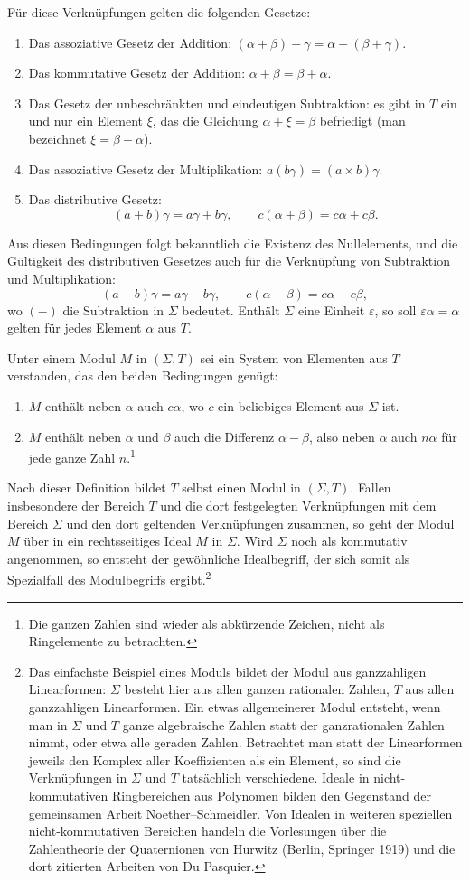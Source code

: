 \documentclass[11pt]{article}
\begin{document}
Für diese Verknüpfungen gelten die folgenden Gesetze:
\begin{enumerate}
\item Das assoziative Gesetz der Addition: $(\alpha+\beta)+\gamma=\alpha+(\beta+\gamma)$.
\item Das kommutative Gesetz der Addition: $\alpha+\beta=\beta+\alpha$.
\item Das Gesetz der unbeschränkten und eindeutigen Subtraktion: es gibt in $T$ ein und nur ein Element $\xi$, das die Gleichung $\alpha+\xi=\beta$ befriedigt (man bezeichnet $\xi=\beta-\alpha$).
\item Das assoziative Gesetz der Multiplikation: $a(b\gamma)=(a\times b)\gamma$.
\item Das distributive Gesetz:
\[
 (a+b)\gamma=a\gamma+b\gamma,\qquad c(\alpha+\beta)=c\alpha+c\beta.
\]
\end{enumerate}
Aus diesen Bedingungen folgt bekanntlich die Existenz des Nullelements, und die Gültigkeit des distributiven Gesetzes auch für die Verknüpfung von Subtraktion und Multiplikation:
\[
 (a-b)\gamma=a\gamma-b\gamma,\qquad c(\alpha-\beta)=c\alpha-c\beta,
\]
wo $(-)$ die Subtraktion in $\Sigma$ bedeutet. Enthält $\Sigma$ eine Einheit $\varepsilon$, so soll $\varepsilon\alpha=\alpha$ gelten für jedes Element $\alpha$ aus $T$.

Unter einem Modul $M$ in $(\Sigma,T)$ sei ein System von Elementen aus $T$ verstanden, das den beiden Bedingungen genügt:
\begin{enumerate}
\item $M$ enthält neben $\alpha$ auch $c\alpha$, wo $c$ ein beliebiges Element aus $\Sigma$ ist.
\item $M$ enthält neben $\alpha$ und $\beta$ auch die Differenz $\alpha-\beta$, also neben $\alpha$ auch $n\alpha$ für jede ganze Zahl $n$.\footnote{Die ganzen Zahlen sind wieder als abkürzende Zeichen, nicht als Ringelemente zu betrachten.}
\end{enumerate}
Nach dieser Definition bildet $T$ selbst einen Modul in $(\Sigma,T)$. Fallen insbesondere der Bereich $T$ und die dort festgelegten Verknüpfungen mit dem Bereich $\Sigma$ und den dort geltenden Verknüpfungen zusammen, so geht der Modul $M$ über in ein rechtsseitiges Ideal $M$ in $\Sigma$. Wird $\Sigma$ noch als kommutativ angenommen, so entsteht der gewöhnliche Idealbegriff, der sich somit als Spezialfall des Modulbegriffs ergibt.\footnote{Das einfachste Beispiel eines Moduls bildet der Modul aus ganzzahligen Linearformen: $\Sigma$ besteht hier aus allen ganzen rationalen Zahlen, $T$ aus allen ganzzahligen Linearformen. Ein etwas allgemeinerer Modul entsteht, wenn man in $\Sigma$ und $T$ ganze algebraische Zahlen statt der ganzrationalen Zahlen nimmt, oder etwa alle geraden Zahlen. Betrachtet man statt der Linearformen jeweils den Komplex aller Koeffizienten als ein Element, so sind die Verknüpfungen in $\Sigma$ und $T$ tatsächlich verschiedene. Ideale in nicht-kommutativen Ringbereichen aus Polynomen bilden den Gegenstand der gemeinsamen Arbeit Noether--Schmeidler. Von Idealen in weiteren speziellen nicht-kommutativen Bereichen handeln die Vorlesungen über die Zahlentheorie der Quaternionen von Hurwitz (Berlin, Springer 1919) und die dort zitierten Arbeiten von Du Pasquier.}
\end{document}
